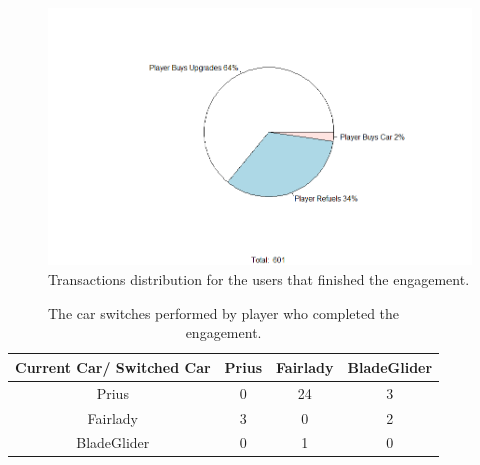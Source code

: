 \documentclass[preprint,authoryear,12pt]{elsarticle}
\begin{document}
\begin{figure}[!htb]
	\begin{center}
		\includegraphics[width=.95\linewidth]{ijhcs14-img/Transactions}
		\caption{Transactions distribution for the users that finished the engagement.\label{fig:engagementtransactions}}
	\end{center}
\end{figure}


\begin{table}[!htb]
	\renewcommand*{\arraystretch}{1.4}
	\caption{The car switches performed by player who completed the engagement.}
	\begin{center}
		\begin{tabular}{c|c|c|c}
			Current Car/ Switched Car & Prius & Fairlady & BladeGlider \\
			\hline
			Prius &	 0
			& 24  & 3  \\
			
			Fairlady & 3
			& 0  &  2 \\
			
			BladeGlider &	 0
			& 1  &  0  \\
		
		\end{tabular}
	\end{center}
	\label{T:Carswitch}
\end{table}
\end{document}

